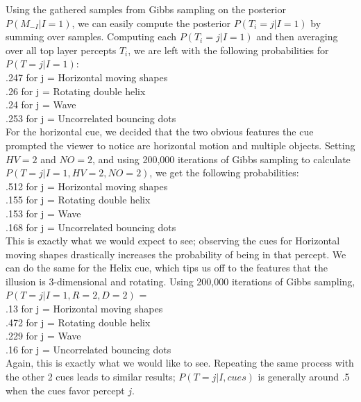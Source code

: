\documentclass{article} %
\begin{document}
Using the gathered samples from Gibbs sampling on the posterior $P(M_{-I}|I=1)$, we can easily compute the posterior $P(T_i = j|I=1)$ by summing over samples. Computing each $P(T_i = j|I=1)$ and then averaging over all top layer percepts $T_i$, we are left with the following probabilities for $P(T=j|I=1)$: \\ 
.247 for j = Horizontal moving shapes \\
.26 for j = Rotating double helix \\
.24 for j = Wave \\
.253 for j = Uncorrelated bouncing dots \\ 

For the horizontal cue, we decided that the two obvious features the cue prompted the viewer to notice are horizontal motion and multiple objects. Setting $HV = 2$ and $NO = 2$, and using 200,000 iterations of Gibbs sampling to calculate $P(T=j|I=1, HV=2, NO=2)$, we get the following probabilities: \\
.512 for j = Horizontal moving shapes \\
.155 for j = Rotating double helix \\
.153 for j = Wave \\
.168 for j = Uncorrelated bouncing dots \\ 

This is exactly what we would expect to see; observing the cues for Horizontal moving shapes drastically increases the probability of being in that percept. We can do the same for the Helix cue, which tips us off to the features that the illusion is 3-dimensional and rotating. Using 200,000 iterations of Gibbs sampling, $P(T=j|I=1, R=2, D=2)$ = \\
.13 for j = Horizontal moving shapes \\
.472 for j = Rotating double helix \\
.229 for j = Wave \\
.16 for j = Uncorrelated bouncing dots \\ 

Again, this is exactly what we would like to see. Repeating the same process with the other 2 cues leads to similar results; $P(T=j|I,cues)$ is generally around .5 when the cues favor percept $j$. 
\end{document}
